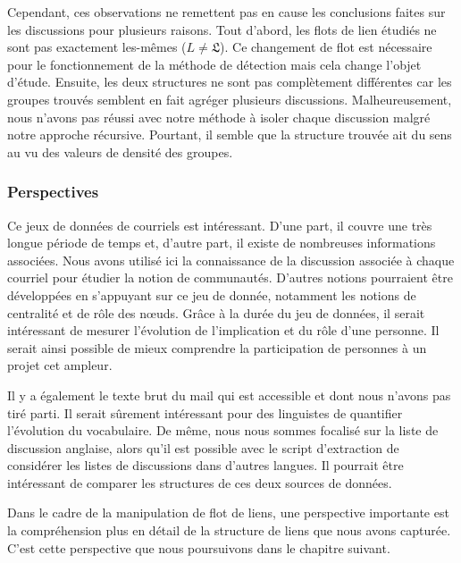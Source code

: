 Cependant, ces observations ne remettent pas en cause les conclusions faites sur les discussions pour plusieurs raisons.
Tout d'abord, les flots de lien étudiés ne sont pas exactement les-mêmes ($L\neq \mathfrak{L}$).
Ce changement de flot est nécessaire pour le fonctionnement de la méthode de détection mais cela change l'objet d'étude.
Ensuite, les deux structures ne sont pas complètement différentes car les groupes trouvés semblent en fait agréger plusieurs discussions.
Malheureusement, nous n'avons pas réussi avec notre méthode à isoler chaque discussion malgré notre approche récursive.
Pourtant, il semble que la structure trouvée ait du sens au vu des valeurs de densité des groupes.

\subsubsection{Perspectives}

Ce jeux de données de courriels est intéressant.
D'une part, il couvre une très longue période de temps et, d'autre part, il existe de nombreuses informations associées.
Nous avons utilisé ici la connaissance de la discussion associée à chaque courriel pour étudier la notion de communautés.
D'autres notions pourraient être développées en s'appuyant sur ce jeu de donnée, notamment les notions de centralité et de rôle des n\oe uds.
Grâce à la durée du jeu de données, il serait intéressant de mesurer l'évolution de l'implication et du rôle d'une personne.
Il serait ainsi possible de mieux comprendre la participation de personnes à un projet cet ampleur.

Il y a également le texte brut du mail qui est accessible et dont nous n'avons pas tiré parti.
Il serait sûrement intéressant pour des linguistes de quantifier l'évolution du vocabulaire.
De même, nous nous sommes focalisé sur la liste de discussion anglaise, alors qu'il est possible avec le script d'extraction de considérer les listes de discussions dans d'autres langues.
Il pourrait être intéressant de comparer les structures de ces deux sources de données.

\bigskip

Dans le cadre de la manipulation de flot de liens, une perspective importante est la compréhension plus en détail de la structure de liens que nous avons capturée.
C'est cette perspective que nous poursuivons dans le chapitre suivant.

